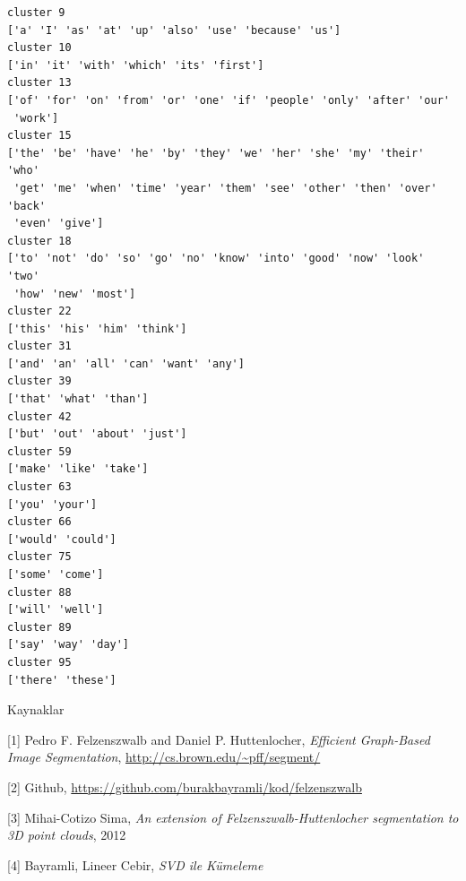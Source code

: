 \documentclass[12pt,fleqn]{article}\usepackage{../../common}
\begin{document}
\begin{verbatim}
cluster 9
['a' 'I' 'as' 'at' 'up' 'also' 'use' 'because' 'us']
cluster 10
['in' 'it' 'with' 'which' 'its' 'first']
cluster 13
['of' 'for' 'on' 'from' 'or' 'one' 'if' 'people' 'only' 'after' 'our'
 'work']
cluster 15
['the' 'be' 'have' 'he' 'by' 'they' 'we' 'her' 'she' 'my' 'their' 'who'
 'get' 'me' 'when' 'time' 'year' 'them' 'see' 'other' 'then' 'over' 'back'
 'even' 'give']
cluster 18
['to' 'not' 'do' 'so' 'go' 'no' 'know' 'into' 'good' 'now' 'look' 'two'
 'how' 'new' 'most']
cluster 22
['this' 'his' 'him' 'think']
cluster 31
['and' 'an' 'all' 'can' 'want' 'any']
cluster 39
['that' 'what' 'than']
cluster 42
['but' 'out' 'about' 'just']
cluster 59
['make' 'like' 'take']
cluster 63
['you' 'your']
cluster 66
['would' 'could']
cluster 75
['some' 'come']
cluster 88
['will' 'well']
cluster 89
['say' 'way' 'day']
cluster 95
['there' 'these']
\end{verbatim}

Kaynaklar

[1] Pedro F. Felzenszwalb and Daniel P. Huttenlocher, {\em Efficient
  Graph-Based Image Segmentation}, \url{http://cs.brown.edu/~pff/segment/}

[2] Github, \url{https://github.com/burakbayramli/kod/felzenszwalb}

[3] Mihai-Cotizo Sima, {\em An extension of Felzenszwalb-Huttenlocher
  segmentation to 3D point clouds}, 2012

[4] Bayramli, Lineer Cebir, {\em SVD ile Kümeleme}
\end{document}
